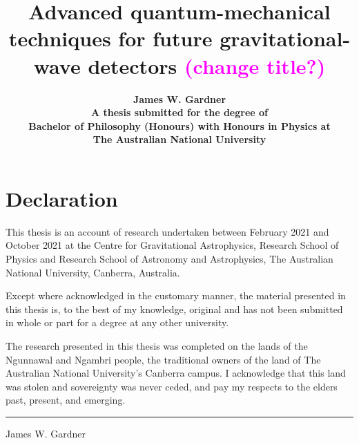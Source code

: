 \documentclass[onecolumn,12pt,a4paper,openany,oneside]{book}
\newcommand{\jam}{\textcolor{magenta}}
\begin{document}

\begin{titlepage}
\title{ \textbf{Advanced quantum-mechanical techniques for future gravitational-wave detectors} \jam{(change title?)}\\[2cm]}
\author{\textbf{James W. Gardner}\\[6cm]
\textbf{A thesis submitted for the degree of}\\
\textbf{Bachelor of Philosophy (Honours) with Honours in Physics at} \\
\textbf{The Australian National University}\\[1cm]}
\date{\textbf{\thismonth}}
\maketitle
\end{titlepage}
 
\sloppy


\chapter*{Declaration}

This thesis is an account of research undertaken between February 2021 and October 2021 at the Centre for Gravitational Astrophysics, Research School of Physics and Research School of Astronomy and Astrophysics, The Australian National University, Canberra, Australia.

Except where acknowledged in the customary manner, the material presented in this thesis is, to the best of my knowledge, original and has not been submitted in whole or part for a degree at any other university.

The research presented in this thesis was completed on the lands of the Ngunnawal and Ngambri people, the traditional owners of the land of The Australian National University's Canberra campus. I acknowledge that this land was stolen and sovereignty was never ceded, and pay my respects to the elders past, present, and emerging. %

\vspace{20mm}
\hspace{80mm}\rule{40mm}{.15mm}\par
\hspace{80mm} James W. Gardner\par
\hspace{80mm} \thismonth
\end{document}
